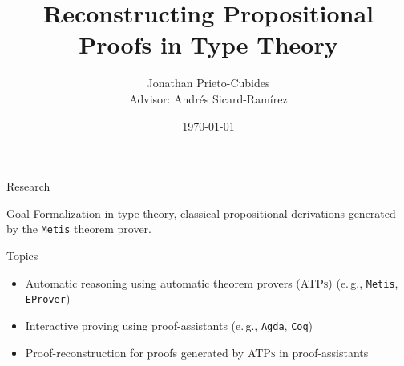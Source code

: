 \documentclass[10pt, xetex, hyperref={pdfpagelabels=false}]{beamer}
\title[Reconstructing Propositional Proofs in Type Theory]
  {\textbf{Reconstructing Propositional Proofs in Type Theory}}
\date{\today}
\author[Jonathan Prieto-Cubides]{Jonathan Prieto-Cubides\\
Advisor: Andr\'es Sicard-Ram\'irez
}
\institute{
Master in Applied Mathematics\\
Universidad EAFIT\\
Medell\'in, Colombia}
\newcommand{\abbre}[1]{\textsc{#1}\xspace}
\newcommand{\ATPs}{\abbre{ATPs}}
\newcommand{\name}[1]{\texttt{#1}\xspace}
\newcommand{\prg}[1]{\texttt{#1}\xspace}
\newcommand{\Agda}{\prg{Agda}}
\newcommand{\Metis}{\prg{Metis}}
\newcommand{\abbrev}[1]{#1} %
\newcommand{\eg}{\abbrev{e.\,g.}}
\begin{document}
\setcounter{page}{1}


\begin{frame}[plain]
\titlepage
\end{frame}


\begin{frame}{Research}

\begin{block}{Goal}
Formalization in type theory, classical propositional
derivations generated by the \Metis theorem prover.
\end{block}
\pause
\begin{block}{Topics}
\begin{itemize}
\item Automatic reasoning using automatic theorem provers (\ATPs) (\eg, \Metis, \name{EProver})
\item Interactive proving using proof-assistants (\eg, \Agda, \name{Coq})
\item Proof-reconstruction for proofs generated by \ATPs in proof-assistants
\end{itemize}
\end{block}
\end{frame}


\end{document}
